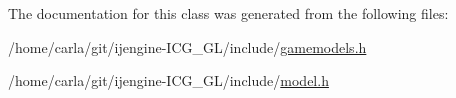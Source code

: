The documentation for this class was generated from the following files\-:\begin{DoxyCompactItemize}
\item 
/home/carla/git/ijengine-\/\-I\-C\-G\-\_\-\-G\-L/include/\hyperlink{gamemodels_8h}{gamemodels.\-h}\item 
/home/carla/git/ijengine-\/\-I\-C\-G\-\_\-\-G\-L/include/\hyperlink{model_8h}{model.\-h}\end{DoxyCompactItemize}
